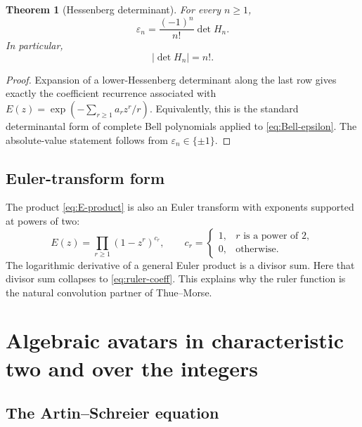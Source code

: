 \documentclass[11pt,oneside]{article}
\newtheorem{theorem}{Theorem}[section]
\theoremstyle{definition}
\theoremstyle{remark}
\newcommand{\eps}{\varepsilon}
\begin{document}
\begin{theorem}[Hessenberg determinant]\label{thm:Hessenberg}
For every $n\ge1$,
\begin{equation}\label{eq:Hessenberg-epsilon}
 \boxed{\qquad
 \eps_n=\frac{(-1)^n}{n!}\det H_n.
 \qquad}
\end{equation}
In particular,
\begin{equation}\label{eq:Hessenberg-factorial}
 |\det H_n|=n!.
\end{equation}
\end{theorem}

\begin{proof}
Expansion of a lower-Hessenberg determinant along the last row gives exactly
the coefficient recurrence associated with
$E(z)=\exp(-\sum_{r\ge1}a_rz^r/r)$.  Equivalently, this is the standard
determinantal form of complete Bell polynomials applied to
\cref{eq:Bell-epsilon}.  The absolute-value statement follows from
$\eps_n\in\{\pm1\}$.
\end{proof}

\subsection{Euler-transform form}

The product \cref{eq:E-product} is also an Euler transform with exponents
supported at powers of two:
\begin{equation}\label{eq:euler-transform}
 E(z)=\prod_{r\ge1}(1-z^r)^{c_r},
 \qquad
 c_r=\begin{cases}1,&r\text{ is a power of }2,\\0,&\text{otherwise.}\end{cases}
\end{equation}
The logarithmic derivative of a general Euler product is a divisor sum.  Here
that divisor sum collapses to \cref{eq:ruler-coeff}.  This explains why the
ruler function is the natural convolution partner of Thue--Morse.

\section{Algebraic avatars in characteristic two and over the integers}

\subsection{The Artin--Schreier equation}
\end{document}
